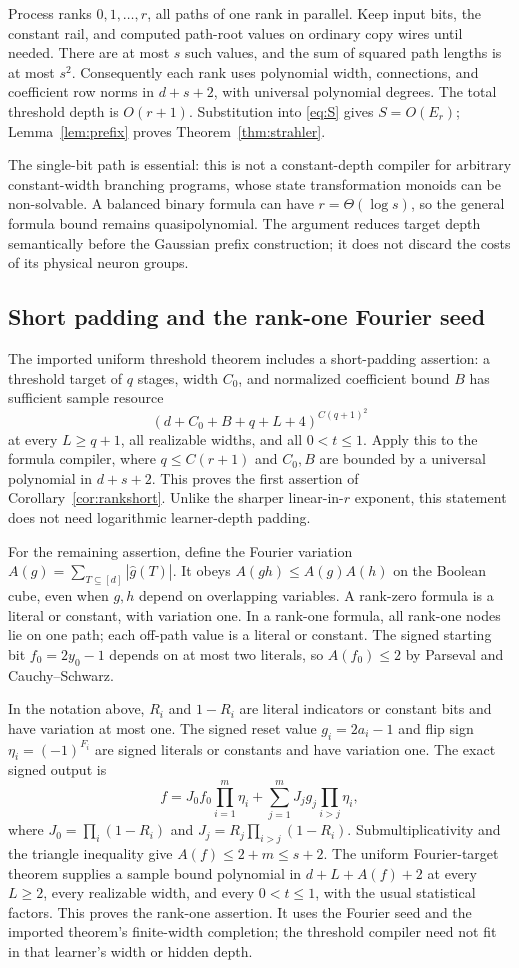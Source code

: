 \documentclass[11pt]{article}
\theoremstyle{remark}\newtheorem{remark}[theorem]{Remark}
\begin{document}
Process ranks $0,1,\ldots,r$, all paths of one rank in parallel.
Keep input bits, the constant rail, and computed path-root values
on ordinary copy wires until needed. There are at most $s$ such
values, and the sum of squared path lengths is at most $s^2$.
Consequently each rank uses polynomial width, connections, and
coefficient row norms in $d+s+2$, with universal polynomial degrees.
The total threshold depth is $O(r+1)$. Substitution into
\eqref{eq:S} gives $S=O(E_r)$; Lemma~\ref{lem:prefix} proves
Theorem~\ref{thm:strahler}.

The single-bit path is essential: this is not a constant-depth
compiler for arbitrary constant-width branching programs, whose
state transformation monoids can be non-solvable. A balanced
binary formula can have $r=\Theta(\log s)$, so the general formula
bound remains quasipolynomial. The argument reduces target depth
semantically before the Gaussian prefix construction; it does not
discard the costs of its physical neuron groups.

\subsection{Short padding and the rank-one Fourier seed}
The imported uniform threshold theorem
\cite[Theorem 1.1]{uniform} includes a short-padding assertion:
a threshold target of $q$ stages, width $C_0$, and normalized
coefficient bound $B$ has sufficient sample resource
\[
 (d+C_0+B+q+L+4)^{C(q+1)^2}
\]
at every $L\ge q+1$, all realizable widths, and all $0<t\le1$.
Apply this to the formula compiler, where $q\le C(r+1)$ and
$C_0,B$ are bounded by a universal polynomial in $d+s+2$.
This proves the first assertion of Corollary~\ref{cor:rankshort}.
Unlike the sharper linear-in-$r$ exponent, this statement does
not need logarithmic learner-depth padding.

For the remaining assertion, define the Fourier variation
$A(g)=\sum_{T\subseteq[d]}|\widehat g(T)|$.
It obeys $A(gh)\le A(g)A(h)$ on the Boolean cube, even when
$g,h$ depend on overlapping variables. A rank-zero formula is
a literal or constant, with variation one. In a rank-one formula,
all rank-one nodes lie on one path; each off-path value is a
literal or constant. The signed starting bit $f_0=2y_0-1$
depends on at most two literals, so $A(f_0)\le2$ by Parseval
and Cauchy--Schwarz.

In the notation above, $R_i$ and $1-R_i$ are literal indicators
or constant bits and have variation at most one. The signed
reset value $g_i=2a_i-1$ and flip sign $\eta_i=(-1)^{F_i}$
are signed literals or constants and have variation one.
The exact signed output is
\[
 f=J_0 f_0\prod_{i=1}^m\eta_i
          +\sum_{j=1}^m J_jg_j\prod_{i>j}\eta_i,
\]
where $J_0=\prod_i(1-R_i)$ and
$J_j=R_j\prod_{i>j}(1-R_i)$.
Submultiplicativity and the triangle inequality give
$A(f)\le2+m\le s+2$.
The uniform Fourier-target theorem
\cite[Theorem 1.2]{uniform} supplies a sample bound polynomial
in $d+L+A(f)+2$ at every $L\ge2$, every realizable width, and
every $0<t\le1$, with the usual statistical factors.
This proves the rank-one assertion. It uses the Fourier seed and
the imported theorem's finite-width completion; the threshold
compiler need not fit in that learner's width or hidden depth.
\end{document}
